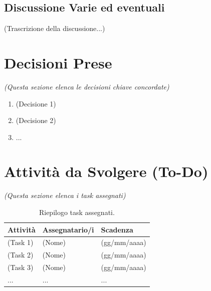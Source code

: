 \documentclass[a4paper, 11pt, oneside]{scrartcl} %
\begin{document}
\subsection{Discussione Varie ed eventuali}
(Trascrizione della discussione...)

\newpage
\section{Decisioni Prese}
\emph{(Questa sezione elenca le decisioni chiave concordate)}

\begin{enumerate}
    \item (Decisione 1)
    \item (Decisione 2)
    \item ...
\end{enumerate}

\newpage
\section{Attività da Svolgere (To-Do)}
\emph{(Questa sezione elenca i task assegnati)}

\begin{table}[h!]
\centering
\begin{tabular}{@{}lll@{}}
\toprule
\textbf{Attività} & \textbf{Assegnatario/i} & \textbf{Scadenza} \\
\midrule
(Task 1) & (Nome) & (gg/mm/aaaa) \\
(Task 2) & (Nome) & (gg/mm/aaaa) \\
(Task 3) & (Nome) & (gg/mm/aaaa) \\
... & ... & ... \\
\bottomrule
\end{tabular}
\caption{Riepilogo task assegnati.}
\end{table}
\end{document}
